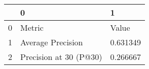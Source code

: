 \begin{tabular}{lll}
\toprule
 & 0 & 1 \\
\midrule
0 & Metric & Value \\
1 & Average Precision & 0.631349 \\
2 & Precision at 30 (P@30) & 0.266667 \\
\bottomrule
\end{tabular}
